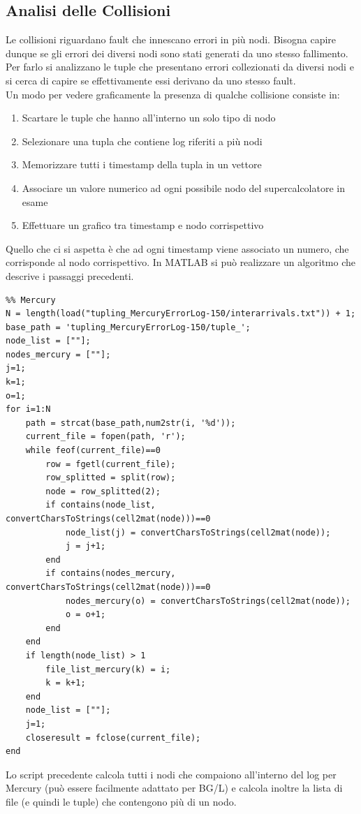 \subsection{Analisi delle Collisioni}
Le collisioni riguardano fault che innescano errori in più nodi. Bisogna capire dunque se gli errori dei diversi nodi sono stati generati da uno stesso fallimento. Per farlo si analizzano le tuple che presentano errori collezionati da diversi nodi e si cerca di capire se effettivamente essi derivano da uno stesso fault. 
\\Un modo per vedere graficamente la presenza di qualche collisione consiste in:
\begin{enumerate}
	\item Scartare le tuple che hanno all'interno un solo tipo di nodo 
	\item Selezionare una tupla che contiene log riferiti a più nodi
	\item Memorizzare tutti i timestamp della tupla in un vettore
	\item Associare un valore numerico ad ogni possibile nodo del supercalcolatore in esame
	\item Effettuare un grafico tra timestamp e nodo corrispettivo
\end{enumerate}
Quello che ci si aspetta è che ad ogni timestamp viene associato un numero, che corrisponde al nodo corrispettivo. In MATLAB si può realizzare un algoritmo che descrive i passaggi precedenti.
\begin{verbatim}
%% Mercury
N = length(load("tupling_MercuryErrorLog-150/interarrivals.txt")) + 1;
base_path = 'tupling_MercuryErrorLog-150/tuple_';
node_list = [""];
nodes_mercury = [""];
j=1;
k=1;
o=1;
for i=1:N
	path = strcat(base_path,num2str(i, '%d'));
	current_file = fopen(path, 'r');
	while feof(current_file)==0
		row = fgetl(current_file);
		row_splitted = split(row);
		node = row_splitted(2);
		if contains(node_list, convertCharsToStrings(cell2mat(node)))==0
			node_list(j) = convertCharsToStrings(cell2mat(node));
			j = j+1;
		end
		if contains(nodes_mercury, convertCharsToStrings(cell2mat(node)))==0
			nodes_mercury(o) = convertCharsToStrings(cell2mat(node));
			o = o+1;
		end
	end
	if length(node_list) > 1
		file_list_mercury(k) = i;
		k = k+1;
	end
	node_list = [""];
	j=1;
	closeresult = fclose(current_file);
end
\end{verbatim}
Lo script precedente calcola tutti i nodi che compaiono all'interno del log per Mercury (può essere facilmente adattato per BG/L) e calcola inoltre la lista di file (e quindi le tuple) che contengono più di un nodo.
